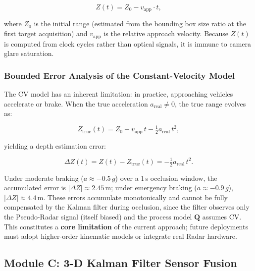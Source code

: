 \documentclass{jstarticle}
\theoremstyle{remark}
\begin{document}
\begin{equation}
Z(t) = Z_0 - v_{\mathrm{app}} \cdot t,
\label{eq:radar_z}
\end{equation}

\noindent where $Z_0$ is the initial range (estimated from the
bounding box size ratio at the first target acquisition) and
$v_{\mathrm{app}}$ is the relative approach velocity. Because $Z(t)$
is computed from clock cycles rather than optical signals, it is immune
to camera glare saturation.

\subsubsection*{Bounded Error Analysis of the Constant-Velocity Model}

The CV model has an inherent limitation: in practice, approaching
vehicles accelerate or brake. When the true acceleration
$a_{\mathrm{real}} \neq 0$, the true range evolves as:

\begin{equation}
Z_{\mathrm{true}}(t) = Z_0 - v_{\mathrm{app}} \, t
                       - \tfrac{1}{2}a_{\mathrm{real}} \, t^2,
\label{eq:radar_true}
\end{equation}

\noindent yielding a depth estimation error:

\begin{equation}
\Delta Z(t) = Z(t) - Z_{\mathrm{true}}(t)
            = -\tfrac{1}{2}a_{\mathrm{real}} \, t^2.
\label{eq:depth_error}
\end{equation}

Under moderate braking ($a \approx -0.5\,g$) over a 1\,s occlusion
window, the accumulated error is $|\Delta Z| \approx 2.45$\,m;
under emergency braking ($a \approx -0.9\,g$),
$|\Delta Z| \approx 4.4$\,m. These errors accumulate monotonically and
cannot be fully compensated by the Kalman filter during occlusion,
since the filter observes only the Pseudo-Radar signal (itself biased)
and the process model $\mathbf{Q}$ assumes CV. This constitutes a
\textbf{core limitation} of the current approach; future deployments
must adopt higher-order kinematic models or integrate real Radar
hardware.

\subsection{Module C: 3-D Kalman Filter Sensor Fusion}
\label{subsec:kf_fusion}
\end{document}
